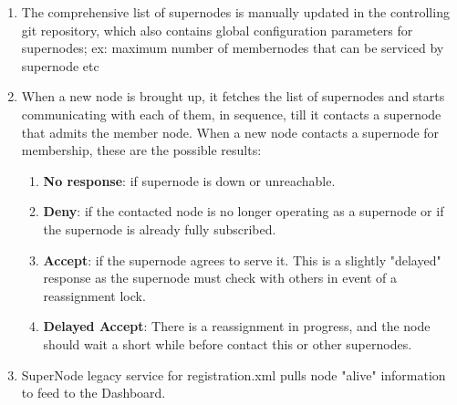 \documentclass[oneside,12pt]{memoir}
\begin{document}
\begin{enumerate}
\item The comprehensive list of supernodes is manually updated in the controlling git repository, which also contains global configuration parameters for supernodes; ex: maximum number of membernodes that can be serviced by supernode etc
\item When a new node is brought up, it fetches the list of supernodes and starts communicating with each of them, in sequence, till it contacts a supernode that admits the member node. When a new node contacts a supernode for membership, these are the possible results:
\begin{enumerate}
\item \textbf{No response}: if supernode is down or unreachable.
\item \textbf{Deny}: if the contacted node is no longer operating as a supernode or if the supernode is already fully subscribed.
\item \textbf{Accept}: if the supernode agrees to serve it.  This is a slightly "delayed" response as the supernode must check with others in event of a reassignment lock. 
\item \textbf{Delayed Accept}:  There is a reassignment in progress, and the node should wait a short while before contact this or other supernodes. 
\end{enumerate}





\item SuperNode legacy service for registration.xml pulls node "alive" information to feed to the Dashboard.  

\end{enumerate}
\end{document}

